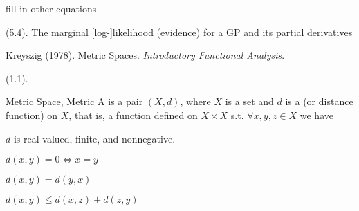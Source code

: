\documentclass[11pt]{article}
\begin{document}
 fill in other equations

 (5.4). The marginal [log-]likelihood (evidence) for a GP and its partial derivatives







\label{Introductory Functional Analysis}

\vspace{-1.7em}
{\scriptsize Kreyszig  (1978). Metric Spaces. \textit{Introductory Functional Analysis}.\\ }

 (1.1). 

\begin{itemdefinition}{Metric Space, Metric}{
	A  is a pair $(X, d)$, where $X$ is a set and $d$ is a  (or distance function) on $X$, that is, a function defined on $X \times X$ s.t. $\forall x, y, z \in X$ we have}

	\item $d$ is real-valued, finite, and nonnegative. 
	
	\item $d(x, y) = 0 \iff x =y$
	
	\item $d(x, y) = d(y, x)$
	
	\item $d(x, y) \leq d(x, z) + d(z, y)$
\end{itemdefinition}
\end{document}
